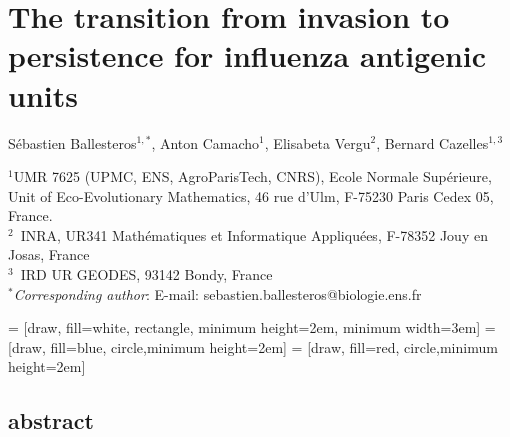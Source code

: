 \chapter{The transition from invasion to persistence for influenza
  antigenic units}


Sébastien Ballesteros$^{1,*}$,
Anton Camacho$^{1}$,
Elisabeta  Vergu$^{2}$,
Bernard Cazelles$^{1,3}$

\vspace{2cm}

$^1$UMR 7625  (UPMC, ENS, AgroParisTech, CNRS), Ecole Normale
Supérieure, Unit of Eco-Evolutionary Mathematics,  46 rue d'Ulm,
F-75230 Paris Cedex 05, France.
\\
$^2$~INRA, UR341 Mathématiques et Informatique Appliquées, F-78352
Jouy en Josas, France
\\
$^3$~IRD UR GEODES, 93142 Bondy, France
\\
$^*$\textit{Corresponding author}:
E-mail: sebastien.ballesteros@biologie.ens.fr


 = [draw, fill=white, rectangle, minimum height=2em, minimum width=3em]
 = [draw, fill=blue, circle,minimum height=2em]
 = [draw, fill=red, circle,minimum height=2em]


\section*{abstract}

